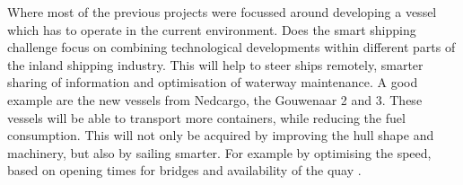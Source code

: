 Where most of the previous projects were focussed around developing a vessel which has to operate in the current environment. Does the smart shipping challenge focus on combining technological developments within different parts of the inland shipping industry. This will help to steer ships remotely, smarter sharing of information and optimisation of waterway maintenance.
A good example are the new vessels from Nedcargo, the Gouwenaar 2 and 3. These vessels will be able to transport more containers, while reducing the fuel consumption. This will not only be acquired by improving the hull shape and machinery, but also by sailing smarter. For example by optimising the speed, based on opening times for bridges and availability of the quay \cite{SMASH2017}. \\ %

